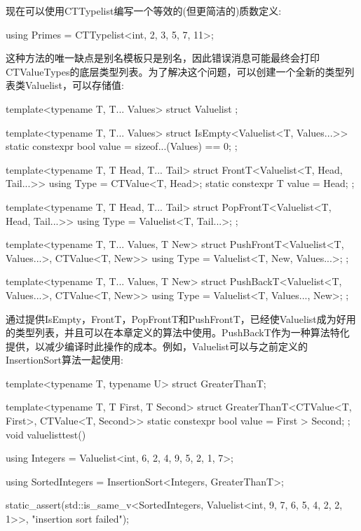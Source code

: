 现在可以使用CTTypelist编写一个等效的(但更简洁的)质数定义:

\begin{cpp}
using Primes = CTTypelist<int, 2, 3, 5, 7, 11>;
\end{cpp}

这种方法的唯一缺点是别名模板只是别名，因此错误消息可能最终会打印CTValueTypes的底层类型列表。为了解决这个问题，可以创建一个全新的类型列表类Valuelist，可以存储值:

\begin{cpp}
template<typename T, T... Values>
struct Valuelist {
};

template<typename T, T... Values>
struct IsEmpty<Valuelist<T, Values...>> {
	static constexpr bool value = sizeof...(Values) == 0;
};

template<typename T, T Head, T... Tail>
struct FrontT<Valuelist<T, Head, Tail...>> {
	using Type = CTValue<T, Head>;
	static constexpr T value = Head;
};

template<typename T, T Head, T... Tail>
struct PopFrontT<Valuelist<T, Head, Tail...>> {
	using Type = Valuelist<T, Tail...>;
};

template<typename T, T... Values, T New>
struct PushFrontT<Valuelist<T, Values...>, CTValue<T, New>> {
	using Type = Valuelist<T, New, Values...>;
};

template<typename T, T... Values, T New>
struct PushBackT<Valuelist<T, Values...>, CTValue<T, New>> {
	using Type = Valuelist<T, Values..., New>;
};
\end{cpp}

通过提供IsEmpty，FrontT，PopFrontT和PushFrontT，已经使Valuelist成为好用的类型列表，并且可以在本章定义的算法中使用。PushBackT作为一种算法特化提供，以减少编译时此操作的成本。例如，Valuelist可以与之前定义的InsertionSort算法一起使用:

\begin{cpp}
template<typename T, typename U>
struct GreaterThanT;

template<typename T, T First, T Second>
struct GreaterThanT<CTValue<T, First>, CTValue<T, Second>> {
	static constexpr bool value = First > Second;
};
void valuelisttest()
{
	using Integers = Valuelist<int, 6, 2, 4, 9, 5, 2, 1, 7>;
	
	using SortedIntegers = InsertionSort<Integers, GreaterThanT>;
	
	static_assert(std::is_same_v<SortedIntegers,
								Valuelist<int, 9, 7, 6, 5, 4, 2, 2, 1>>,
				"insertion sort failed");
}
\end{cpp}


